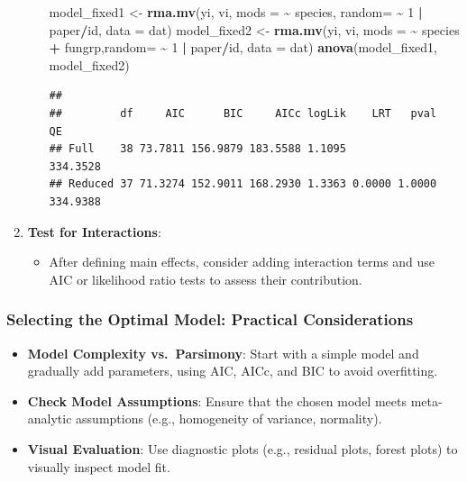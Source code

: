 \documentclass[
]{book}
\newenvironment{Shaded}{\begin{snugshade}}{\end{snugshade}}
\newcommand{\AttributeTok}[1]{\textcolor[rgb]{0.13,0.29,0.53}{#1}}
\newcommand{\DecValTok}[1]{\textcolor[rgb]{0.00,0.00,0.81}{#1}}
\newcommand{\FunctionTok}[1]{\textcolor[rgb]{0.13,0.29,0.53}{\textbf{#1}}}
\newcommand{\NormalTok}[1]{#1}
\newcommand{\OtherTok}[1]{\textcolor[rgb]{0.56,0.35,0.01}{#1}}
\newcommand{\SpecialCharTok}[1]{\textcolor[rgb]{0.81,0.36,0.00}{\textbf{#1}}}
\providecommand{\tightlist}{%
  \setlength{\itemsep}{0pt}\setlength{\parskip}{0pt}}
\begin{document}
\begin{enumerate}
\begin{itemize}
\begin{Shaded}
\begin{Highlighting}[]
\NormalTok{model\_fixed1 }\OtherTok{\textless{}{-}} \FunctionTok{rma.mv}\NormalTok{(yi, vi, }\AttributeTok{mods =} \SpecialCharTok{\textasciitilde{}}\NormalTok{ species, }\AttributeTok{random=} \SpecialCharTok{\textasciitilde{}} \DecValTok{1} \SpecialCharTok{|}\NormalTok{ paper}\SpecialCharTok{/}\NormalTok{id, }\AttributeTok{data =}\NormalTok{ dat)}
\NormalTok{model\_fixed2 }\OtherTok{\textless{}{-}} \FunctionTok{rma.mv}\NormalTok{(yi, vi, }\AttributeTok{mods =} \SpecialCharTok{\textasciitilde{}}\NormalTok{ species }\SpecialCharTok{+}\NormalTok{ fungrp,}\AttributeTok{random=} \SpecialCharTok{\textasciitilde{}} \DecValTok{1} \SpecialCharTok{|}\NormalTok{ paper}\SpecialCharTok{/}\NormalTok{id, }\AttributeTok{data =}\NormalTok{ dat)}
\FunctionTok{anova}\NormalTok{(model\_fixed1, model\_fixed2)}
\end{Highlighting}
\end{Shaded}

\begin{verbatim}
## 
##         df     AIC      BIC     AICc logLik    LRT   pval       QE 
## Full    38 73.7811 156.9879 183.5588 1.1095               334.3528 
## Reduced 37 71.3274 152.9011 168.2930 1.3363 0.0000 1.0000 334.9388
\end{verbatim}
  \end{itemize}
\item
  \textbf{Test for Interactions}:

  \begin{itemize}
  \tightlist
  \item
    After defining main effects, consider adding interaction terms and use AIC or likelihood ratio tests to assess their contribution.
  \end{itemize}
\end{enumerate}

\subsubsection{\texorpdfstring{\textbf{Selecting the Optimal Model: Practical Considerations}}{Selecting the Optimal Model: Practical Considerations}}\label{selecting-the-optimal-model-practical-considerations}

\begin{itemize}
\tightlist
\item
  \textbf{Model Complexity vs.~Parsimony}: Start with a simple model and gradually add parameters, using AIC, AICc, and BIC to avoid overfitting.
\item
  \textbf{Check Model Assumptions}: Ensure that the chosen model meets meta-analytic assumptions (e.g., homogeneity of variance, normality).
\item
  \textbf{Visual Evaluation}: Use diagnostic plots (e.g., residual plots, forest plots) to visually inspect model fit.
\end{itemize}
\end{document}
